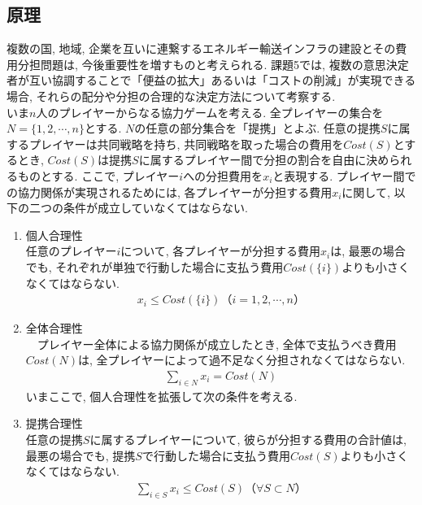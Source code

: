 \documentclass[]{jsarticle}
\begin{document}
  \subsection{原理}
      複数の国, 地域, 企業を互いに連繋するエネルギー輸送インフラの建設とその費用分担問題は, 今後重要性を増すものと考えられる. 課題5では, 複数の意思決定者が互い協調することで「便益の拡大」あるいは「コストの削減」が実現できる場合, それらの配分や分担の合理的な決定方法について考察する.\\

      いま$n$人のプレイヤーからなる協力ゲームを考える. 全プレイヤーの集合を$N = \{ 1, 2, \cdots , n\}$とする. $N$の任意の部分集合を「提携」とよぶ. 任意の提携$S$に属するプレイヤーは共同戦略を持ち, 共同戦略を取った場合の費用を$Cost(S)$とするとき, $Cost(S)$は提携$S$に属するプレイヤー間で分担の割合を自由に決められるものとする. ここで, プレイヤー$i$への分担費用を$x_i$と表現する. プレイヤー間での協力関係が実現されるためには, 各プレイヤーが分担する費用$x_i$に関して, 以下の二つの条件が成立していなくてはならない.

    \begin{enumerate}
      \renewcommand{\labelenumi}{(\alph{enumi})}
      \item 個人合理性\\
        任意のプレイヤー$i$について, 各プレイヤーが分担する費用$x_i$は, 最悪の場合でも, それぞれが単独で行動した場合に支払う費用$Cost(\{i\})$よりも小さくなくてはならない.
        \begin{eqnarray}
          \label{kojin}
          x_i \le Cost(\{i\})　（i = 1, 2, \cdots , n）
        \end{eqnarray}
      \item 全体合理性\\
      　プレイヤー全体による協力関係が成立したとき, 全体で支払うべき費用$Cost(N)$は, 全プレイヤーによって過不足なく分担されなくてはならない.
        \begin{eqnarray}
          \sum_{i \in N} x_i = Cost(N)
        \end{eqnarray}
      いまここで, 個人合理性を拡張して次の条件を考える.
      \item 提携合理性\\
        任意の提携$S$に属するプレイヤーについて, 彼らが分担する費用の合計値は, 最悪の場合でも, 提携$S$で行動した場合に支払う費用$Cost(S)$よりも小さくなくてはならない.
        \begin{eqnarray}
          \label{teikei}
          \sum_{i \in S} x_i \le Cost(S)　（\forall S \subset N）
        \end{eqnarray}
    \end{enumerate}
\end{document}
